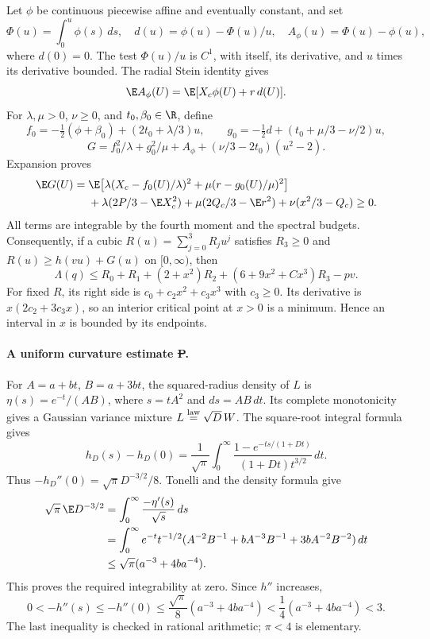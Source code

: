 Let $\phi$ be continuous piecewise affine and eventually constant, and set
\[
 \Phi(u)=\int_0^u\phi(s)\,ds,\quad
 d(u)=\phi(u)-\Phi(u)/u,\quad A_\phi(u)=\Phi(u)-\phi(u),
\]
where $d(0)=0$. The test $\Phi(u)/u$ is $C^1$, with itself, its derivative,
and $u$ times its derivative bounded. The radial Stein identity gives
\[
 \E A_\phi(U)=\E[X_c\phi(U)+r\,d(U)].
\]
For $\lambda,\mu>0$, $\nu\ge0$, and $t_0,\beta_0\in\R$, define
\[
 f_0=-\tfrac12(\phi+\beta_0)+(2t_0+\lambda/3)u,\qquad
 g_0=-\tfrac12d+(t_0+\mu/3-\nu/2)u,
\]
\[
 G=f_0^2/\lambda+g_0^2/\mu+A_\phi
                       +(\nu/3-2t_0)(u^2-2).
\]
Expansion proves
\begin{align*}
 \E G(U)={}&
 \E\!\left[\lambda(X_c-f_0(U)/\lambda)^2
                +\mu(r-g_0(U)/\mu)^2\right]\\
 &+\lambda(2P/3-\E X_c^2)
  +\mu(2Q_c/3-\E r^2)+\nu(x^2/3-Q_c)\ge0.
\end{align*}
All terms are integrable by the fourth moment and the spectral budgets.
Consequently, if a cubic $R(u)=\sum_{j=0}^3R_ju^j$ satisfies
$R_3\ge0$ and $R(u)\ge h(vu)+G(u)$ on $[0,\infty)$, then
\begin{equation}\label{eq:independent-stein-node}
 \Lambda(q)\le R_0+R_1+(2+x^2)R_2+
                        (6+9x^2+Cx^3)R_3-pv.
\end{equation}
For fixed $R$, its right side is $c_0+c_2x^2+c_3x^3$ with $c_3\ge0$.
Its derivative is $x(2c_2+3c_3x)$, so an interior critical point at
$x>0$ is a minimum. Hence an interval in $x$ is bounded by its endpoints.

\paragraph{A uniform curvature estimate \st{P}.}
For $A=a+bt$, $B=a+3bt$, the squared-radius density of $L$ is
$\eta(s)=e^{-t}/(AB)$, where $s=tA^2$ and $ds=AB\,dt$.
Its complete monotonicity gives a Gaussian variance mixture
$L\stackrel{\rm law}=\sqrt D\,W$.
The square-root integral formula gives
\[
 h_D(s)-h_D(0)=\frac1{\sqrt\pi}\int_0^\infty
       \frac{1-e^{-ts/(1+Dt)}}{(1+Dt)t^{3/2}}\,dt.
\]
Thus $-h_D''(0)=\sqrt\pi D^{-3/2}/8$. Tonelli and the density formula give
\begin{align*}
 \sqrt\pi\,\E D^{-3/2}
 &=\int_0^\infty\frac{-\eta'(s)}{\sqrt s}\,ds\\
 &=\int_0^\infty e^{-t}t^{-1/2}
      (A^{-2}B^{-1}+bA^{-3}B^{-1}+3bA^{-2}B^{-2})\,dt\\
 &\le\sqrt\pi(a^{-3}+4ba^{-4}).
\end{align*}
This proves the required integrability at zero. Since $h''$ increases,
\[
 0<-h''(s)\le-h''(0)
 \le\frac{\sqrt\pi}{8}(a^{-3}+4ba^{-4})
 <\frac14(a^{-3}+4ba^{-4})<3.
\]
The last inequality is checked in rational arithmetic; $\pi<4$ is elementary.

